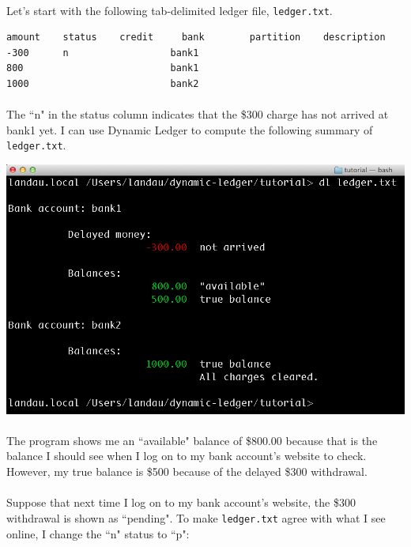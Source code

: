 \documentclass{article}
\begin{document}
\begin{flushleft}
\paragraph{} Let's start with the following tab-delimited ledger file, {\tt ledger.txt}.

\begin{lstlisting}[title=ledger.txt]
amount    status	credit     bank        partition    description
-300      n                  bank1
800                          bank1
1000                         bank2
\end{lstlisting}

\paragraph{} The ``n" in the status column indicates that the \$300 charge has not arrived at bank1 yet. I can use Dynamic Ledger to compute the following summary of {\tt ledger.txt}.

\begin{center}
\includegraphics[scale=.45]{fig/sum0.png}
\end{center} 

\paragraph{} The program shows me an ``available" balance of \$800.00 because that is the balance I should see when I log on to my bank account's website to check. However, my true balance is \$500 because of the delayed \$300 withdrawal. 

\paragraph{} Suppose that next time I log on to my bank account's website, the \$300 withdrawal is shown as ``pending". To make {\tt ledger.txt} agree with what I see online, I change the ``n" status to ``p":


\end{flushleft}
\end{document}
